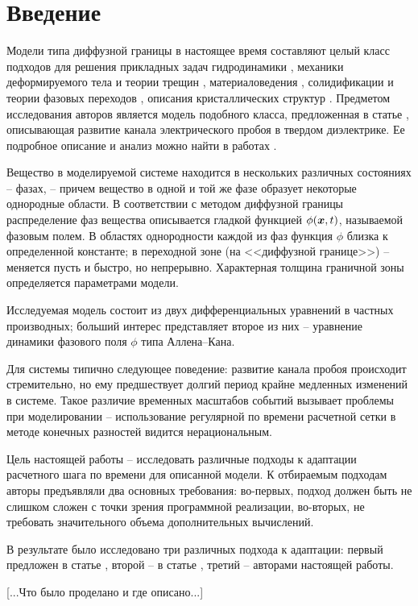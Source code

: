 
\section{Введение}

Модели типа диффузной границы в настоящее время составляют целый класс подходов для решения прикладных задач гидродинамики \cite{lamorgese_flow_modeling, kim_fluid_flows, xu_hydrodynamics}, механики деформируемого тела и теории трещин \cite{ambati_fracture}, материаловедения \cite{provatas_materials}, солидификации и теории фазовых переходов \cite{boettinger_solidification, cartalade_phase_separation, gransaly_solidification}, описания кристаллических структур \cite{emmerich_crystal, asadi_crystal, provatas_crystal}. Предметом исследования авторов является модель подобного класса, предложенная в статье \cite{pitike_dielectric_breakdown}, описывающая развитие канала электрического пробоя в твердом диэлектрике. Ее подробное описание и анализ можно найти в работах \cite{zipunova_higher_codimension, zipunova_thermomechanical, ponomarev_stability}.

Вещество в моделируемой системе находится в нескольких различных состояниях -- фазах, -- причем вещество в одной и той же фазе образует некоторые однородные области. В соответствии с методом диффузной границы распределение фаз вещества описывается гладкой функцией $\phi({\boldsymbol{x}}, t)$, называемой фазовым полем. В областях однородности каждой из фаз функция $\phi$ близка к определенной константе; в переходной зоне (на <<диффузной границе>>) -- меняется пусть и быстро, но непрерывно. Характерная толщина граничной зоны определяется параметрами модели.

Исследуемая модель состоит из двух дифференциальных уравнений в частных производных; больший интерес представляет второе из них -- уравнение динамики фазового поля $\phi$ типа Аллена--Кана.

Для системы типично следующее поведение: развитие канала пробоя происходит стремительно, но ему предшествует долгий период крайне медленных изменений в системе. Такое различие временных масштабов событий вызывает проблемы при моделировании -- использование регулярной по времени расчетной сетки в методе конечных разностей видится нерациональным.

Цель настоящей работы -- исследовать различные подходы к адаптации расчетного шага по времени для описанной модели. К отбираемым подходам авторы предъявляли два основных требования: во-первых, подход должен быть не слишком сложен с точки зрения программной реализации, во-вторых, не требовать значительного объема дополнительных вычислений.

В результате было исследовано три различных подхода к адаптации: первый предложен в статье \cite{li_time_step}, второй -- в статье \cite{zhang_time_step}, третий -- авторами настоящей работы.

[...Что было проделано и где описано...]